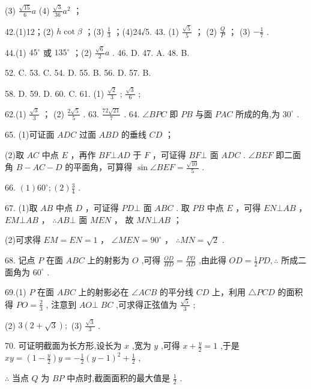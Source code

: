 \documentclass[10pt]{article}
\newcommand*\circled[1]{\tikz[baseline=(char.base)]{\node[shape=circle,draw,inner sep=1.5pt] (char) {\small #1};}}
\begin{document}
(3) \(\frac{\sqrt{15}}{6}a\) (4) \(\frac{\sqrt{3}}{36}{a}^{2}\) ；

42.(1)12；(2) \(h\cot \beta\) ；(3) \(\frac{1}{3}\) ；(4)24√5. 43. (1) \(\frac{\sqrt{5}}{5}\) ； (2) \(\frac{Q}{P}\) ； (3) \(- \frac{1}{7}\) .

44.(1) \({45}^{ \circ  }\) 或 \({135}^{ \circ  }\) ；(2) \(\frac{\sqrt{6}}{2}a\) . 46. D. 47. A. 48. B.

52. C. 53. C. 54. D. 55. B. 56. D. 57. B.

58. D. 59. D. 60. C. 61. (1)  \circled{1}  \(\frac{\sqrt{2}}{3}\) ;  \circled{2}  \(\frac{\sqrt{3}}{6}\) ;

62.(1) \(\frac{\sqrt{3}}{3}\) ； (2) \(\frac{2\sqrt{5}}{5}\) . 63. \(\frac{{72}\sqrt{21}}{7}\) . 64. \(\angle {BPC}\) 即 \({PB}\) 与面 \({PAC}\) 所成的角,为 \({30}^{ \circ  }\) .

65. (1)可证面 \({ADC}\) 过面 \({ABD}\) 的垂线 \({CD}\) ；

(2)取 \({AC}\) 中点 \(E\) ，再作 \({BF} \bot  {AD}\) 于 \(F\) ，可证得 \({BF} \bot\) 面 \({ADC}\) . \(\angle {BEF}\) 即二面角 \(B - {AC} - D\) 的平面角，可算得 \(\sin \angle {BEF} = \frac{\sqrt{10}}{5}\) .

66. \(\left( 1\right) {60}^{ \circ  };\left( 2\right) \frac{3}{4}\) .

67. (1)取 \({AB}\) 中点 \(D\) ，可证得 \({PD} \bot\) 面 \({ABC}\) . 取 \({PB}\) 中点 \(E\) ，可得 \({EN} \bot  {AB}\) ， \({EM} \bot  {AB}\) ， \(\therefore {AB} \bot\) 面 \({MEN}\) ， 故 \({MN} \bot  {AB}\) ；

(2)可求得 \({EM} = {EN} = 1\) ， \({\angle {MEN}} = {90}^{ \circ  }\) ， \(\therefore {MN} = \sqrt{2}\) .

68. 记点 \(P\) 在面 \({ABC}\) 上的射影为 \(O\) ,可得 \(\frac{OD}{HD} = \frac{PD}{AD}\) ,由此得 \({OD} = \frac{1}{2}{PD},\therefore\) 所成二面角为 \({60}^{ \circ  }\) .

69.(1) \circled{1}  \(P\) 在面 \({ABC}\) 上的射影必在 \(\angle {ACB}\) 的平分线 \({CD}\) 上，利用 \(\bigtriangleup  {PCD}\) 的面积得 \({PO} = \frac{2}{3}\) , \circled{2} 注意到 \({AO} \bot \; {BC}\) ,可求得正弦值为 \(\frac{\sqrt{5}}{3}\) ;

(2) \(3\left( {2 + \sqrt{3}}\right) ;\) (3) \(\frac{\sqrt{3}}{3}\) .

70. 可证明截面为长方形,设长为 \(x\) ,宽为 \(y\) ,可得 \(x + \frac{y}{2} = 1\) ,于是 \({xy} = \left( {1 - \frac{y}{2}}\right) y =  - \frac{1}{2}{\left( y - 1\right) }^{2} + \frac{1}{2}\) ,

\(\therefore\) 当点 \(Q\) 为 \({BP}\) 中点时,截面面积的最大值是 \(\frac{1}{2}\) .
\end{document}
